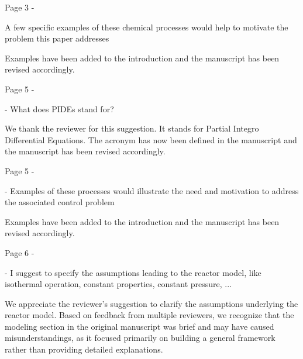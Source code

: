 \documentclass[11pt,answers]{exam}
\begin{document}
\begin{questions}

    \question Page 3 - 

    A few specific examples of these chemical processes would help to motivate the problem this paper addresses

    \begin{solutionorbox} \label{comment:1_1}
        Examples have been added to the introduction and the manuscript has been revised accordingly.
    \end{solutionorbox}

    \question Page 5 - 

    - What does PIDEs stand for?

    \begin{solutionorbox} \label{comment:1_2}
        We thank the reviewer for this suggestion. It stands for Partial Integro Differential Equations. The acronym has now been defined in the manuscript and the manuscript has been revised accordingly.
    \end{solutionorbox}


    \question Page 5 - 

    - Examples of these processes would illustrate the need and motivation to address the associated
    control problem

    \begin{solutionorbox} \label{comment:1_3}
        Examples have been added to the introduction and the manuscript has been revised accordingly.
    \end{solutionorbox}


    \question Page 6 - 

    - I suggest to specify the assumptions leading to the reactor model, like isothermal operation,
    constant properties, constant pressure, ...

    \begin{solutionorbox} \label{comment:1_4}
        We appreciate the reviewer’s suggestion to clarify the assumptions underlying the reactor model. Based on feedback from multiple reviewers, we recognize that the modeling section in the original manuscript was brief and may have caused misunderstandings, as it focused primarily on building a general framework rather than providing detailed explanations.


\end{solutionorbox}
\end{questions}
\end{document}
